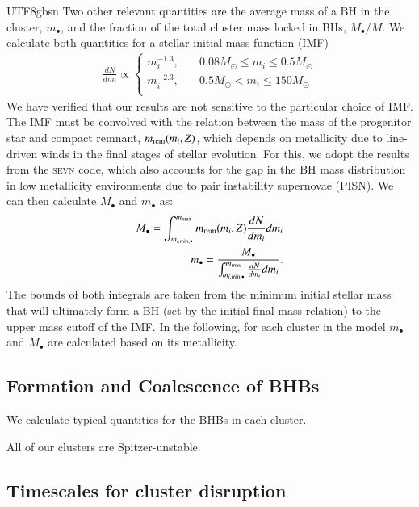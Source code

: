 \documentclass[trackchanges, twocolappendix, twocolumn]{aastex701}
\begin{document}
\begin{CJK*}{UTF8}{gbsn}
Two other relevant quantities are the average mass of a BH in the cluster, $m_\bullet$, and the fraction of the total cluster mass locked in BHs, $M_\bullet/M$. We calculate both quantities for a \cite{kroupa_2001} stellar initial mass function (IMF)
\begin{align} 
\frac{dN}{dm_i}  \propto \begin{cases} m^{-1.3}_i, & \quad 0.08 M_\odot \leqslant m_i \leqslant 0.5 M_\odot \\ 
m_i^{-2.3}, & \quad 0.5 M_\odot < m_i \leqslant 150 M_\odot \\
\end{cases}
\end{align}
We have verified that our results are not sensitive to the particular choice of IMF. The IMF must be convolved with the relation between the mass of the progenitor star and compact remnant, $m_{\rm rem}(m_i, Z)$, which depends on metallicity due to line-driven winds in the final stages of stellar evolution. For this, we adopt the results from the \textsc{sevn} code, which also accounts for the gap in the BH mass distribution in low metallicity environments due to pair instability supernovae (PISN). We can then calculate $M_\bullet$ and $m_\bullet$ as:
\begin{align}
M_\bullet = \int_{m_{i, \rm min, \bullet}}^{m_{\rm max}} m_{\rm rem}(m_i, Z) \frac{dN}{dm_i} dm_i \nonumber \\
m_\bullet = \frac{M_\bullet}{\int_{m_{i, \rm min, \bullet}}^{m_{\rm max}} \frac{dN}{dm_i} dm_i }.
\end{align}
The bounds of both integrals are taken from the minimum initial stellar mass that will ultimately form a BH  (set by the initial-final mass relation) to the upper mass cutoff of the IMF. In the following, for each cluster in the model $m_\bullet$ and $M_\bullet$ are calculated based on its metallicity.

\subsection{Formation and Coalescence of BHBs}

We calculate typical quantities for the BHBs in each cluster. 

All of our clusters are Spitzer-unstable.

\subsection{Timescales for cluster disruption}


\end{CJK*}
\end{document}
